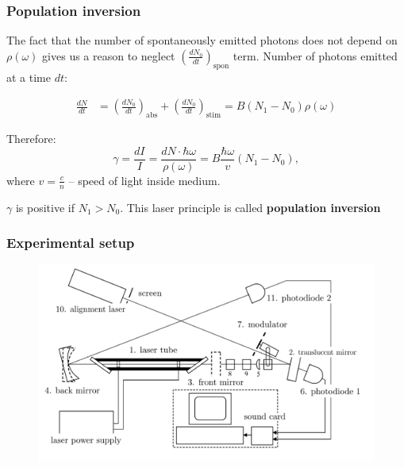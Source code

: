 \documentclass{beamer}
\begin{document}
	\begin{frame}
		\frametitle{Population inversion}
		The fact that the number of spontaneously emitted photons does not depend on  $\rho(\omega)$ gives us a reason to neglect $\left(\frac{dN_0}{dt}\right)_{\text{spon}}$ term. Number of photons emitted at a time $dt$:
		
		\begin{equation} \label{eq1}
			\begin{split}
				\frac{dN}{dt} & = \left(\frac{dN_0}{dt}\right)_{\text{abs}} + \left(\frac{dN_0}{dt}\right)_{\text{stim}} =  B (N_1 - N_0) \rho(\omega)
			\end{split}
		\end{equation}

		Therefore:
		\begin{equation}
			\gamma = \frac{dI}{I} = \frac{dN \cdot \hbar\omega}{\rho(\omega)} = B\frac{\hbar\omega }{v} (N_1 - N_0), 
		\end{equation}
		where $v = \frac{c}{n}$ -- speed of light inside medium.
		
		\vspace*{20px}
		\centering
		$\gamma$ is positive if $N_1 > N_0$. This laser principle is called \textbf{population inversion}
	\end{frame}


\begin{frame}
	\frametitle{Experimental setup}
	\begin{figure}
		\centering
		\includegraphics[width=1.1\linewidth]{res/experimental_setup.pdf}
	\end{figure}

\end{frame}
\end{document}

